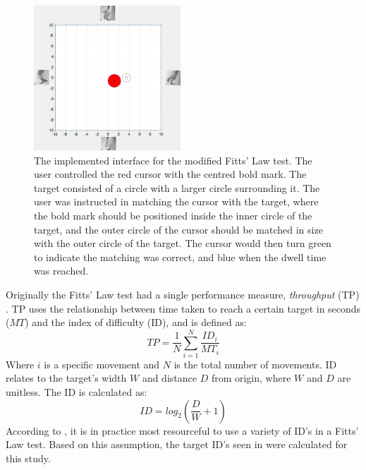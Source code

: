 \begin{figure}[H] 
	\includegraphics[width=0.49\textwidth]{figures/xBackground/perftestGUI}
	\caption{The implemented interface for the modified Fitts' Law test. The user controlled the red cursor with the centred bold mark. The target consisted of a circle with a larger circle surrounding it. The user was instructed in matching the cursor with the target, where the bold mark should be positioned inside the inner circle of the target, and the outer circle of the cursor should be matched in size with the outer circle of the target. The cursor would then turn green to indicate the matching was correct, and blue when the dwell time was reached.}
	\label{fig:fittsLawTask}
\end{figure}
\vspace{-0.2cm}
Originally the Fitts' Law test had a single performance measure, \textit{throughput} (TP) \cite{Fitts1954}. TP uses the relationship between time taken to reach a certain target in seconds ($MT$) and the index of difficulty (ID), and is defined as:
\begin{equation} \label{eq:TP}
TP=\frac{1}{N}\sum_{i=1}^{N} \frac{ID_i}{MT_i} 
\end{equation}
\noindent Where $i$ is a specific movement and $N$ is the total number of movements. ID relates to the target's width $W$ and distance $D$ from origin, where $W$ and $D$ are unitless. The ID is calculated as: 
\begin{equation} \label{eq:ID}
ID=log_2(\frac{D}{W}+1)
\end{equation}
\noindent According to \cite{Scheme2013a}, it is in practice most resourceful to use a variety of ID's in a Fitts' Law test. Based on this assumption, the target ID's seen in  were calculated for this study.

